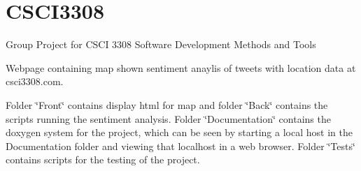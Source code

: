 \href{https://travis-ci.org/lalyon/csci3308}{\tt } \section*{C\+S\+C\+I3308}

Group Project for C\+S\+CI 3308 Software Development Methods and Tools

Webpage containing map shown sentiment anaylis of tweets with location data at csci3308.\+com.

Folder \char`\"{}\+Front\char`\"{} contains display html for map and folder \char`\"{}\+Back\char`\"{} contains the scripts running the sentiment analysis. Folder \char`\"{}\+Documentation\char`\"{} contains the doxygen system for the project, which can be seen by starting a local host in the Documentation folder and viewing that localhost in a web browser. Folder \char`\"{}\+Tests\char`\"{} contains scripts for the testing of the project. 